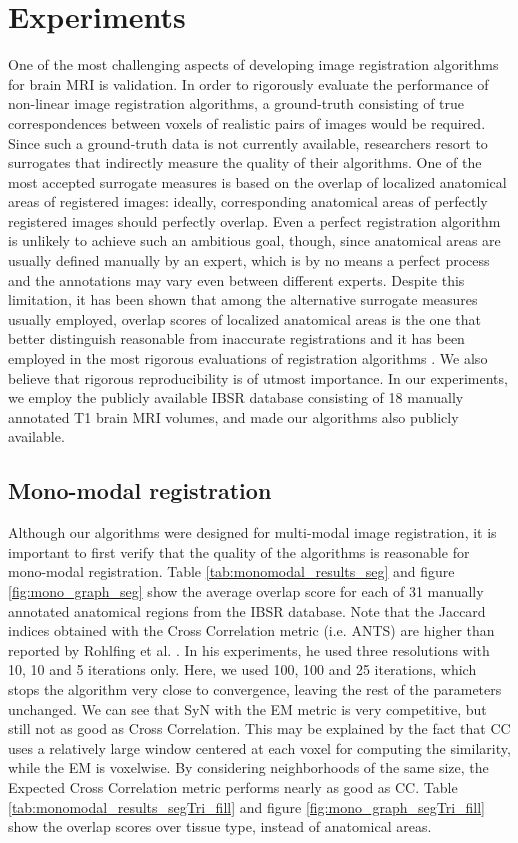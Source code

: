 \section{Experiments}
One of the most challenging aspects of developing image registration algorithms for brain MRI is validation. In order to rigorously evaluate the performance of non-linear
image registration algorithms, a ground-truth consisting of true correspondences between voxels of realistic pairs of images would be required. Since such a ground-truth data is
not currently available, researchers resort to surrogates that indirectly measure the quality of their algorithms. One of the most accepted surrogate measures is based
on the overlap of localized anatomical areas of registered images: ideally, corresponding anatomical areas of perfectly registered images should perfectly
overlap. Even a perfect registration algorithm is unlikely to achieve such an ambitious goal, though, since anatomical areas are usually defined manually by an expert, which is
by no means a perfect process and the annotations may vary even between different experts. Despite this limitation, it has been shown that among the alternative surrogate measures
usually employed, overlap scores of localized anatomical areas is the one that better distinguish reasonable from inaccurate registrations \cite{Rohlfing2012} and it has been employed
in the most rigorous evaluations of registration algorithms \cite{Klein2009}\cite{Klein2010}\cite{Rohlfing2012}. We also believe that rigorous reproducibility is of utmost importance. In our
experiments, we employ the publicly available IBSR database consisting of 18 manually annotated T1 brain MRI volumes, and made our algorithms also publicly available.

\subsection{Mono-modal registration}
Although our algorithms were designed for multi-modal image registration, it is important to first verify that the quality of the algorithms is reasonable for mono-modal registration.
Table \ref{tab:monomodal_results_seg} and figure \ref{fig:mono_graph_seg} show the average overlap score for each of 31 manually annotated anatomical regions from the IBSR database.
Note that the Jaccard indices obtained with the Cross Correlation metric (i.e. ANTS) are higher than reported by Rohlfing et al. \cite{Rohlfing2012}. In his experiments, he used
three resolutions with 10, 10 and 5 iterations only. Here, we used 100, 100 and 25 iterations, which stops the algorithm very close to convergence, leaving the rest of the parameters
unchanged. We can see that SyN with the EM metric is very competitive, but still not as good as Cross Correlation. This may be explained by the fact that CC uses a relatively large
window centered at each voxel for computing the similarity, while the EM is voxelwise. By considering neighborhoods of the same size, the Expected Cross Correlation metric performs
nearly as good as CC. Table \ref{tab:monomodal_results_segTri_fill} and figure \ref{fig:mono_graph_segTri_fill} show the overlap scores over tissue type, instead of anatomical areas.

